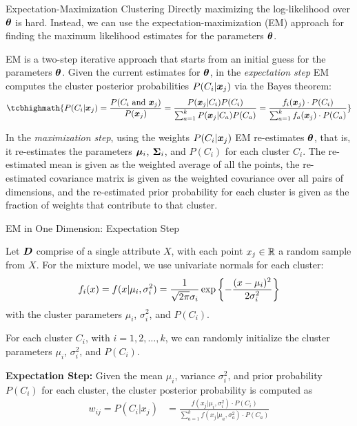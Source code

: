 \begin{frame}{Expectation-Maximization Clustering}
Directly maximizing the log-likelihood over ${\bm \theta}$ is hard.
Instead, we can use the
expectation-maximization (EM)
approach for f\/{i}nding the maximum likelihood estimates
for the parameters ${\bm \theta}$.

\medskip
EM is a two-step iterative approach that
starts from an initial guess for the parameters ${\bm \theta}$.
Given the current estimates for ${\bm \theta}$, in the {\em expectation step}
EM computes the cluster posterior probabilities $P(C_i|{\boldsymbol x}_{j})$ via the Bayes
theorem:
\begin{align*}
\tcbhighmath{
  P(C_i | \bx_{j}) = \frac{P(C_i \mbox{ and } \bx_{j})}{P(\bx_{j})} =
  \frac{P(\bx_{j} | C_i) P(C_i)}{\sum_{a=1}^k P(\bx_{j} | C_a) P(C_a)}
 = \frac{f_i(\bx_{j}) \cdot P(C_{i})}
    {\sum_{a=1}^k f_a(\bx_{j}) \cdot P(C_{a})}
}
\end{align*}

In the {\em maximization step}, using the weights
$P(C_i|{\boldsymbol x}_{j})$ EM re-estimates ${\bm \theta}$, that is, it re-estimates the parameters ${\bm \mu}_i$, ${\bm \Sigma}_i$,
and $P(C_i)$ for each cluster $C_i$.
The re-estimated mean is given as the weighted average of
all the points, the re-estimated covariance matrix is given as
the weighted covariance over all pairs of dimensions, and the
re-estimated prior probability for each cluster is given as the
fraction of weights that contribute to that cluster.
\end{frame}



\begin{frame}{EM in One Dimension: Expectation Step}

Let ${\boldsymbol D}$ comprise of a single attribute $X$,
with each point $x_{j} \in {\mathord{\mathbb R}}$ a random
sample from $X$. 
For the mixture model, we use univariate normals for each
cluster:
\begin{align*}
  f_i(x) = f(x | \mu_i, \sigma_i^2) =
  \frac{1}{\sqrt{2\pi}\sigma_i} \exp \left\{-\frac{(x -
  \mu_i)^2}{2\sigma_i^2} \right \}
\end{align*}
with the cluster parameters $\mu_{i}$, $\sigma_{i}^2$, and
$P(C_i)$.  


For each cluster $C_{i}$, with $i =
1,2,\ldots, k$, we can randomly initialize the cluster parameters
$\mu_{i}$, $\sigma_{i}^2$, and $P(C_i)$. 

\medskip
{\bf Expectation Step:}
Given 
the mean
$\mu_i$, variance $\sigma_i^2$, and prior probability $P(C_i)$ for each
cluster, the cluster posterior probability is computed as
\begin{align*}
  w_{ij} = P(C_{i}|x_{j}) & =
    \frac{f(x_{j}|\mu_i,\sigma_i^2) \cdot P(C_{i})}
    {\sum_{a=1}^k f(x_{j} |\mu_a, \sigma_a^2) \cdot P(C_{a})}
\end{align*}
\end{frame}



